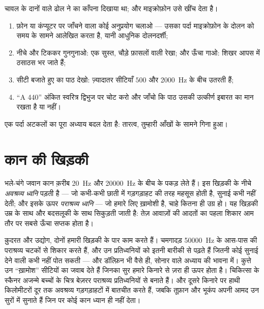 \begin{method}[ध्वनि को देखना]\label{met:g8:sound-pitch-loudness:seeing}
चावल के दानों वाले ढोल ने  का काँपना दिखाया था; और माइक्रोफ़ोन
उसे खींच देता है।
\begin{enumerate}
  \item फ़ोन या कंप्यूटर पर  जाँचने वाला कोई अनुप्रयोग चलाओ ---
        उसका पर्दा माइक्रोफ़ोन के दोलन को समय के सामने आलेखित करता है,
        यानी आधुनिक दोलनदर्शी;
  \item नीचे और टिककर गुनगुनाओ: एक सुस्त, चौड़े फ़ासलों वाली रेखा; और
        ऊँचा गाओ: शिखर आपस में ठसाठस भर जाते हैं;
  \item सीटी बजाते हुए  का पाठ देखो: ज़्यादातर सीटियाँ $500$
        और \qty{2000}{Hz} के बीच उतरती हैं;
  \item ``A 440'' अंकित स्वरित्र द्विभुज पर चोट करो और जाँचो कि पाठ
        उसकी उत्कीर्ण इबारत का मान रखता है या नहीं।
\end{enumerate}
एक पर्दा अटकलों का पूरा अध्याय बदल देता है: तारत्व, तुम्हारी आँखों के
सामने गिना हुआ।
\end{method}

\section{कान की खिड़की}

\begin{proposition}[इंसानी श्रवण का परास]\label{prop:g8:sound-pitch-loudness:range}
भले-चंगे जवान कान क़रीब \qty{20}{Hz} और \qty{20000}{Hz} के बीच के
 पकड़ लेते हैं। इस खिड़की के नीचे \emph{अवश्रव्य
ध्वनि} पड़ती है --- जो कभी-कभी छाती में
गड़गड़ाहट की तरह महसूस होती है, सुनाई कभी नहीं देती; और इसके ऊपर
\emph{पराश्रव्य ध्वनि} --- जो हमारे लिए
ख़ामोशी है, चाहे  कितना ही उग्र हो। यह खिड़की उम्र के साथ और
बदसलूकी के साथ सिकुड़ती जाती है: तेज़ आवाज़ों की आदतों का पहला शिकार
आम तौर पर सबसे ऊँचा सप्तक होता है।
\end{proposition}

\begin{example}[किनारों के पार]\label{ex:g8:sound-pitch-loudness:beyond}
क़ुदरत और उद्योग, दोनों हमारी खिड़की के पार काम करते हैं। चमगादड़
\qty{50000}{Hz} के आस-पास की पराश्रव्य चटकों से शिकार करते हैं, और उन
प्रतिध्वनियों को इतनी बारीकी से पढ़ते हैं जितनी कोई सुनाई देने वाली
 कभी नहीं पोत सकती --- और डॉल्फ़िन भी वैसे ही, सोनार वाले अध्याय
की भावना में। कुत्ते उन ``ख़ामोश'' सीटियों का जवाब देते हैं जिनका सुर
हमारे किनारे से ज़रा ही ऊपर होता है। चिकित्सा के स्कैनर अजन्मे बच्चों
के चित्र बेज़रर पराश्रव्य प्रतिध्वनियों से बनाते हैं। और दूसरे किनारे
पर हाथी किलोमीटरों दूर तक अवश्रव्य गड़गड़ाहटों में बातचीत करते हैं,
जबकि तूफ़ान और भूकंप अपनी आमद उन सुरों में सुनाते हैं जिन पर कोई कान
ध्यान ही नहीं देता।
\end{example}

